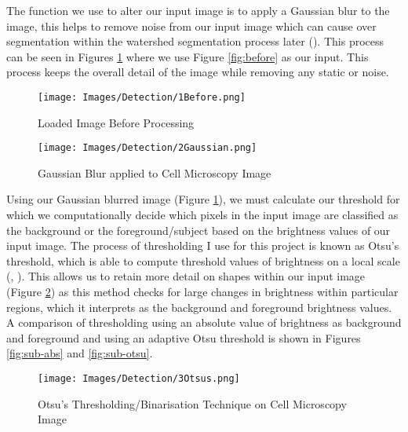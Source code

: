 \documentclass[12pt a4paper]{article}
\begin{document}
The function we use to alter our input image is to apply a Gaussian blur to the image, this helps to remove noise from our input image which can cause over segmentation within the watershed segmentation process later (\cite{gauch1999image}). This process can be seen in Figures \ref{fig:blurred} where we use Figure \ref{fig:before} as our input. This process keeps the overall detail of the image while removing any static or noise.
\begin{figure}
  \centering
  \begin{minipage}[b]{0.4\textwidth}
    \texttt{[image: Images/Detection/1Before.png]}
    \caption{Loaded Image Before Processing}
    \label{fig:before}
  \end{minipage}
  \hfill
  \begin{minipage}[b]{0.4\textwidth}
    \texttt{[image: Images/Detection/2Gaussian.png]}
    \caption{Gaussian Blur applied to Cell Microscopy Image}
    \label{fig:blurred}
  \end{minipage}
\end{figure}
Using our Gaussian blurred image (Figure \ref{fig:blurred}), we must calculate our threshold for which we computationally decide which pixels in the input image are classified as the background or the foreground/subject based on the brightness values of our input image. The process of thresholding I use for this project is known as Otsu's threshold, which is able to compute threshold values of brightness on a local scale (\cite{vala2013review}, \cite{kittler1985threshold}). This allows us to retain more detail on shapes within our input image (Figure \ref{fig:otsuTresh}) as this method checks for large changes in brightness within particular regions, which it interprets as the background and foreground brightness values. A comparison of thresholding using an absolute value of brightness as background and foreground and using an adaptive Otsu threshold is shown in Figures \ref{fig:sub-abs} and \ref{fig:sub-otsu}.



\begin{figure}
    \centering
    \texttt{[image: Images/Detection/3Otsus.png]}
    \caption{Otsu's Thresholding/Binarisation Technique on Cell Microscopy Image}
    \label{fig:otsuTresh}
\end{figure}
\end{document}
